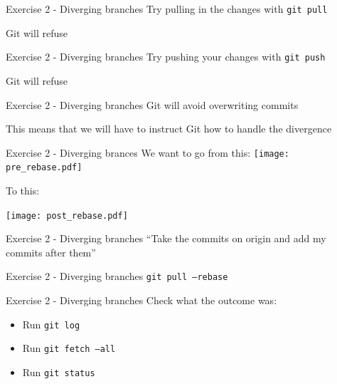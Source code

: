 \documentclass{beamer}
\newcommand{\fmtcmd}[1]{\texttt{#1}}
\begin{document}
\begin{frame}{Exercise 2 - Diverging branches}
  \center
  \Huge Try pulling in the changes with \fmtcmd{git pull}
  \pause

  \vspace{0.5cm}
  \Huge Git will refuse
\end{frame}

\begin{frame}{Exercise 2 - Diverging branches}
  \center
  \Huge Try pushing your changes with \fmtcmd{git push}
  \pause

  \vspace{0.5cm}
  \Huge Git will refuse
\end{frame}

\begin{frame}{Exercise 2 - Diverging branches}
  \center
  \Huge Git will avoid overwriting commits
  \pause

  \LARGE This means that we will have to instruct Git how to handle
  the divergence
\end{frame}

\begin{frame}{Exercise 2 - Diverging brances}
  \center
  \huge We want to go from this:
  \texttt{[image: pre\_rebase.pdf]}
  \pause

  \huge To this:
  \vspace{0.1cm}

  \texttt{[image: post\_rebase.pdf]}
\end{frame}

\begin{frame}{Exercise 2 - Diverging branches}
  \center
  \LARGE ``Take the commits on origin and add my commits after them''
\end{frame}

\begin{frame}{Exercise 2 - Diverging branches}
  \center
  \Huge \fmtcmd{git pull --rebase}
\end{frame}

\begin{frame}{Exercise 2 - Diverging branches}
  Check what the outcome was:

  \begin{itemize}
    \item Run \fmtcmd{git log}
    \item Run \fmtcmd{git fetch --all}
    \item Run \fmtcmd{git status}
  \end{itemize}
\end{frame}
\end{document}
